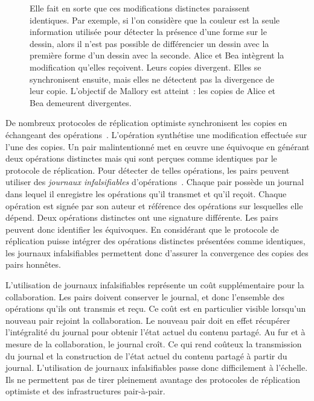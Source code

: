\begin{figure}[hbt]
{Elle fait en sorte que ces modifications distinctes paraissent identiques.
Par exemple, si l'on considère que la couleur est la seule information utilisée pour détecter la présence d'une forme sur le dessin, alors il n'est pas possible de différencier un dessin avec la première forme d'un dessin avec la seconde.
 Alice et Bea intègrent la modification qu'elles reçoivent.
Leurs copies divergent.
Elles se synchronisent ensuite, mais elles ne détectent pas la divergence de leur copie.
L'objectif de Mallory est atteint~: les copies de Alice et Bea demeurent divergentes.}\label{fig:equivocation-scenario}
\end{figure}

De nombreux protocoles de réplication optimiste synchronisent les copies en échangeant des opérations~\autocite{baquero_2018_pure-op-crdt}.
L'opération synthétise une modification effectuée sur l'une des copies.
Un pair malintentionné met en œuvre une équivoque en générant deux opérations distinctes mais qui sont perçues comme identiques par le protocole de réplication.
Pour détecter de telles opérations, les pairs peuvent utiliser des \emph{journaux infalsifiables} d'opérations~\autocite{li_2004_sundr,mahajan_depot_2011,truong_authenticating_2012}.
Chaque pair possède un journal dans lequel il enregistre les opérations qu'il transmet et qu'il reçoit.
Chaque opération est signée par son auteur et référence des opérations sur lesquelles elle dépend.
Deux opérations distinctes ont une signature différente.
Les pairs peuvent donc identifier les équivoques.
En considérant que le protocole de réplication puisse intégrer des opérations distinctes présentées comme identiques, les journaux infalsifiables permettent donc d'assurer la convergence des copies des pairs honnêtes.

L'utilisation de journaux infalsifiables représente un coût supplémentaire pour la collaboration.
Les pairs doivent conserver le journal, et donc l'ensemble des opérations qu'ils ont transmis et reçu.
Ce coût est en particulier visible lorsqu'un nouveau pair rejoint la collaboration.
Le nouveau pair doit en effet récupérer l'intégralité du journal pour obtenir l'état actuel du contenu partagé.
Au fur et à mesure de la collaboration, le journal croît.
Ce qui rend coûteux la transmission du journal et la construction de l'état actuel du contenu partagé à partir du journal.
L'utilisation de journaux infalsifiables passe donc difficilement à l'échelle.
Ils ne permettent pas de tirer pleinement avantage des protocoles de réplication optimiste et des infrastructures pair-à-pair.

